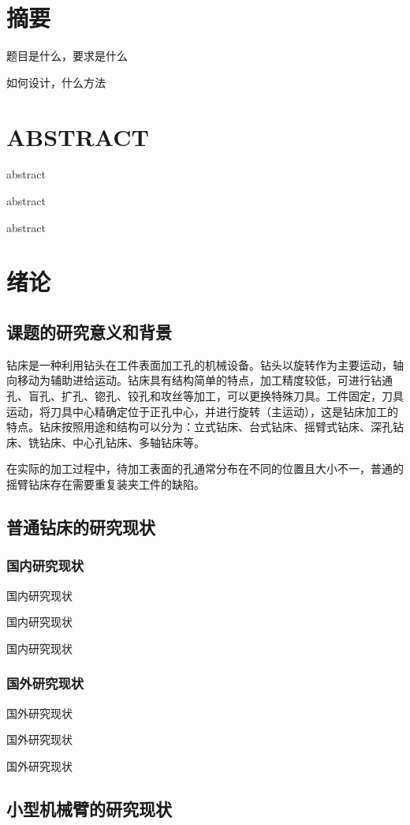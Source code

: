 \documentclass[UTF8]{article}%
\newcommand{\sun}{\CJKfamily{sun}}
\newcommand{\xiaosihao}{\fontsize{12pt}{\baselineskip}\selectfont}%
\newcommand{\n}{\par}%
\begin{document}
\begin{spacing}{1.5}%
\setlength{\parindent}{2em}%
\sun\xiaosihao%
\setlength{\abovedisplayskip}{1.5pt}%
\setlength{\belowdisplayskip}{1.5pt}%
\section*{摘要}
	题目是什么，要求是什么\n
	如何设计，什么方法\n
\clearpage
\section*{ABSTRACT}
	abstract\n
	abstract\n
	abstract\n
\clearpage
\begin{spacing}{1.2}
	\tableofcontents%
\end{spacing}
\clearpage
{}%
\setcounter{page}{1}%
\section{绪论}
	\subsection{课题的研究意义和背景}
	钻床是一种利用钻头在工件表面加工孔的机械设备。钻头以旋转作为主要运动，轴向移动为辅助进给运动。钻床具有结构简单的特点，加工精度较低，可进行钻通孔、盲孔、扩孔、锪孔、铰孔和攻丝等加工，可以更换特殊刀具。工件固定，刀具运动，将刀具中心精确定位于正孔中心，并进行旋转（主运动），这是钻床加工的特点。钻床按照用途和结构可以分为：立式钻床、台式钻床、摇臂式钻床、深孔钻床、铣钻床、中心孔钻床、多轴钻床等。\n
	在实际的加工过程中，待加工表面的孔通常分布在不同的位置且大小不一，普通的摇臂钻床存在需要重复装夹工件的缺陷。
	\subsection{普通钻床的研究现状}
		\subsubsection{国内研究现状}
		国内研究现状\n
		国内研究现状\n
		国内研究现状\n
		\subsubsection{国外研究现状}
		国外研究现状\n
		国外研究现状\n
		国外研究现状\n
	\subsection{小型机械臂的研究现状}

\end{spacing}
\end{document}
